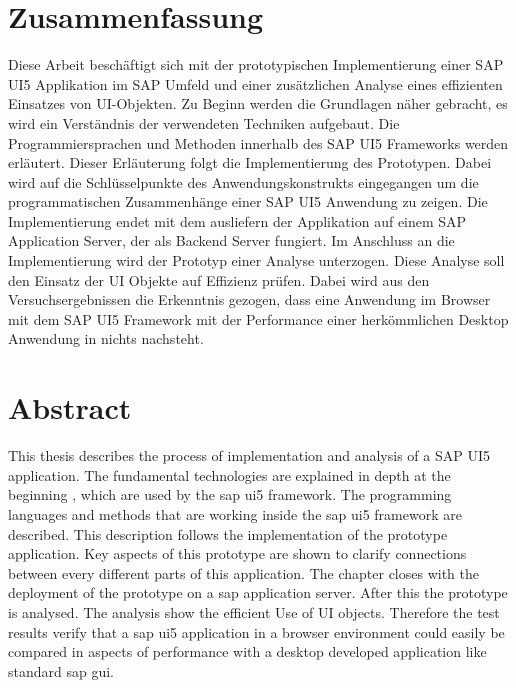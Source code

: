 \section*{Zusammenfassung}
Diese Arbeit beschäftigt sich mit der prototypischen Implementierung einer SAP UI5 Applikation im SAP Umfeld und einer zusätzlichen Analyse eines effizienten Einsatzes von UI-Objekten. Zu Beginn werden die Grundlagen näher gebracht, es wird ein Verständnis der verwendeten Techniken aufgebaut. Die Programmiersprachen und Methoden innerhalb des SAP UI5 Frameworks werden erläutert. Dieser Erläuterung folgt die Implementierung des Prototypen. Dabei wird auf die Schlüsselpunkte des Anwendungskonstrukts eingegangen um die programmatischen Zusammenhänge einer SAP UI5 Anwendung zu zeigen. Die Implementierung endet mit dem ausliefern der Applikation auf einem SAP Application Server, der als Backend Server fungiert. Im Anschluss an die Implementierung wird der Prototyp einer Analyse unterzogen. Diese Analyse soll den Einsatz der UI Objekte auf Effizienz prüfen. Dabei wird aus den Versuchsergebnissen die Erkenntnis gezogen, dass eine Anwendung im Browser mit dem SAP UI5 Framework mit der Performance einer herkömmlichen Desktop Anwendung in nichts nachsteht.


%


\section*{Abstract}
This thesis describes the process of implementation and analysis of a SAP UI5 application. The fundamental technologies are explained in depth at the beginning , which are used by the sap ui5 framework. The programming languages and methods that are working inside the sap ui5 framework are described. This description follows the implementation of the prototype application. Key aspects of this prototype are shown to clarify connections between every different parts of this application. The chapter closes with the deployment of the prototype on a sap application server. After this the prototype is analysed. The analysis show the efficient Use of UI objects. Therefore the test results verify that a sap ui5 application in a browser environment could easily be compared in aspects of performance with a desktop developed application like standard sap gui.